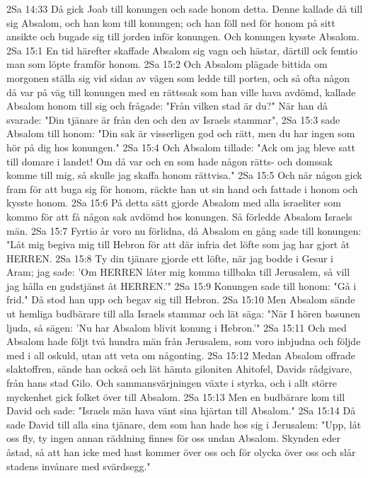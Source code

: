 2Sa 14:33  Då gick Joab till konungen och sade honom detta. Denne kallade då till sig Absalom, och han kom till konungen; och han föll ned för honom på sitt ansikte och bugade sig till jorden inför konungen. Och konungen kysste Absalom.
2Sa 15:1  En tid härefter skaffade Absalom sig vagn och hästar, därtill ock femtio man som löpte framför honom.
2Sa 15:2  Och Absalom plägade bittida om morgonen ställa sig vid sidan av vägen som ledde till porten, och så ofta någon då var på väg till konungen med en rättssak som han ville hava avdömd, kallade Absalom honom till sig och frågade: "Från vilken stad är du?" När han då svarade: "Din tjänare är från den och den av Israels stammar",
2Sa 15:3  sade Absalom till honom: "Din sak är visserligen god och rätt, men du har ingen som hör på dig hos konungen."
2Sa 15:4  Och Absalom tillade: "Ack om jag bleve satt till domare i landet! Om då var och en som hade någon rätts- och domssak komme till mig, så skulle jag skaffa honom rättvisa."
2Sa 15:5  Och när någon gick fram för att buga sig för honom, räckte han ut sin hand och fattade i honom och kysste honom.
2Sa 15:6  På detta sätt gjorde Absalom med alla israeliter som kommo för att få någon sak avdömd hos konungen. Så förledde Absalom Israels män.
2Sa 15:7  Fyrtio år voro nu förlidna, då Absalom en gång sade till konungen: "Låt mig begiva mig till Hebron för att där infria det löfte som jag har gjort åt HERREN.
2Sa 15:8  Ty din tjänare gjorde ett löfte, när jag bodde i Gesur i Aram; jag sade: 'Om HERREN låter mig komma tillbaka till Jerusalem, så vill jag hålla en gudstjänst åt HERREN.'"
2Sa 15:9  Konungen sade till honom: "Gå i frid." Då stod han upp och begav sig till Hebron.
2Sa 15:10  Men Absalom sände ut hemliga budbärare till alla Israels stammar och lät säga: "När I hören basunen ljuda, så sägen: 'Nu har Absalom blivit konung i Hebron.'"
2Sa 15:11  Och med Absalom hade följt två hundra män från Jerusalem, som voro inbjudna och följde med i all oskuld, utan att veta om någonting.
2Sa 15:12  Medan Absalom offrade slaktoffren, sände han också och lät hämta giloniten Ahitofel, Davids rådgivare, från hans stad Gilo. Och sammansvärjningen växte i styrka, och i allt större myckenhet gick folket över till Absalom.
2Sa 15:13  Men en budbärare kom till David och sade: "Israels män hava vänt sina hjärtan till Absalom."
2Sa 15:14  Då sade David till alla sina tjänare, dem som han hade hos sig i Jerusalem: "Upp, låt oss fly, ty ingen annan räddning finnes för oss undan Absalom. Skynden eder åstad, så att han icke med hast kommer över oss och för olycka över oss och slår stadens invånare med svärdsegg."
